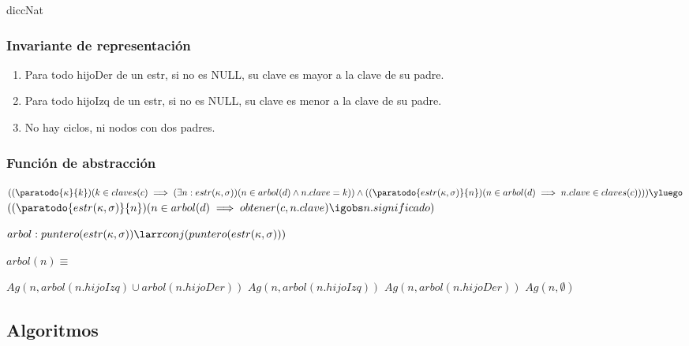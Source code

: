 diccNat

\subsubsection*{Invariante de representación}

\begin{enumerate}
\item Para todo hijoDer de un estr, si no es NULL, su clave es mayor a la clave de su padre.
\item Para todo hijoIzq de un estr, si no es NULL, su clave es menor a la clave de su padre.
\item No hay ciclos, ni nodos con dos padres.
\end{enumerate}


\subsubsection*{Función de abstracción}
$((\paratodo{\kappa}{k})( k \in claves(c) \implies (\exists n: estr(\kappa, \sigma))(n \in arbol(d) \land n.clave = k)) \land ((\paratodo{estr(\kappa, \sigma)}{n})(n \in arbol(d) \implies n.clave \in claves(c)))) \yluego $\\$((\paratodo{estr(\kappa, \sigma)}{n})(n \in arbol(d) \implies obtener(c,n.clave) \igobs n.significado)$
  
$arbol: puntero(estr(\kappa, \sigma)) \larr conj(puntero(estr(\kappa, \sigma)))$

$arbol(n) \equiv $
\begin{algorithmic}
	\State $Ag(n, arbol(n.hijoIzq) \cup arbol(n.hijoDer))$
\Else
		\State $Ag(n,arbol(n.hijoIzq))$
	\Else
		\State $Ag(n,arbol(n.hijoDer))$ 
		\Else 
		\State $Ag(n,\emptyset)$ 
		\EndIf
	\EndIf
\EndIf
\end{algorithmic}
		


\subsection{Algoritmos}


